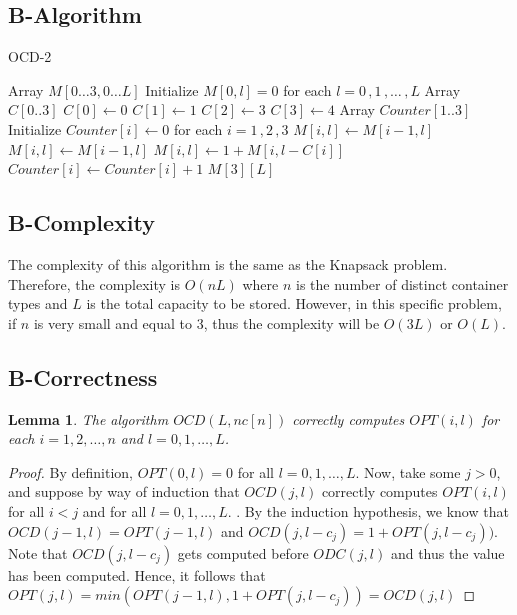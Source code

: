 \documentclass{article}
\theoremstyle{definition}
\theoremstyle{remark}
\theoremstyle{plain}
\newtheorem{lem}[thm]{Lemma}
\begin{document}
\subsection*{B-Algorithm}
\begin{algorithm}
\caption{OCD-2}\label{Dynamic algorithm for OCD}
\begin{algorithmic}[1]
 
        \State Array $M[0\ldots 3, 0\ldots L]$
        \State Initialize $M[0, l] = 0$ for each $l=0\,,1\,,\ldots\,,L$
        \State Array $C[0..3]$
        \State $C[0] \gets 0$
        \State $C[1] \gets 1$
        \State $C[2] \gets 3$
        \State $C[3] \gets 4$
        \State Array $Counter[1..3]$
        \State Initialize $Counter[i] \gets 0$ for each $i=1\,,2\,,3$
			      \State $M[i,l] \gets M[i-1,l]$
		        \Else {}
			          	\State $M[i,l] \gets M[i-1, l]$
			       \Else
			       		\State $M[i,l] \gets 1 + M[i, l-C[i]]$
					\State $Counter[i] \gets Counter[i] + 1$
			       \EndIf   		            
		        \EndIf
		\EndFor
	\EndFor
	\State \Return $M[3][L]$
\EndProcedure
\end{algorithmic}
\end{algorithm}


\subsection*{B-Complexity}
The complexity of this algorithm is the same as the Knapsack problem. Therefore, the complexity is $O(nL)$ where $n$ is the number of distinct container types and $L$ is the total capacity to be stored. However, in this specific problem, if $n$ is very small and equal to 3, thus the complexity will be $O(3L)$ or $O(L)$.

\subsection*{B-Correctness}
\begin{lem}
The algorithm $OCD(L, n c[n])$ correctly computes $OPT(i, l)$ for each $i = 1,2,\ldots,n$ and $l = 0, 1, \ldots,L$.
\end{lem}
\begin{proof}
By definition, $OPT(0,l) = 0$ for all $l = 0, 1, \ldots,L$. 
Now, take some $j > 0$, and suppose by way of induction that $OCD(j,l)$ correctly computes $OPT(i,l)$ for all $i < j$ and for all $l = 0, 1, \ldots,L$. . By the induction hypothesis, we know that $OCD(j-1, l) = OPT(j-1,l)$ and $OCD(j,l - c_j) = 1 + OPT(j, l - c_j))$.  Note that $OCD(j, l - c_j)$ gets computed before $ODC(j,l)$ and thus the value has been computed.  Hence, it follows that 
$OPT(j,l) = min( OPT(j-1,l), 1 + OPT(j, l - c_j)) = OCD(j,l)$
\end{proof}
\end{document}
